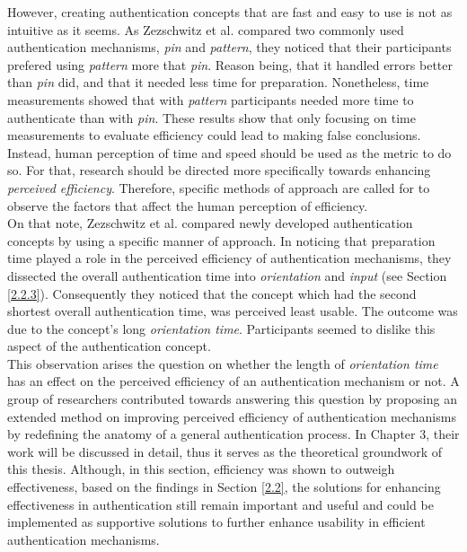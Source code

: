 However, creating authentication concepts that are fast and easy to use is not as intuitive as it seems. As Zezschwitz et al. \cite{PatternWild} compared two commonly used authentication mechanisms, \textit{pin} and \textit{pattern}, they noticed that their participants prefered using \textit{pattern} more that \textit{pin}. Reason being, that it handled errors better than \textit{pin} did, and that it needed less time for preparation. Nonetheless, time measurements showed that with \textit{pattern} participants needed more time to authenticate than with \textit{pin}. These results show that only focusing on time measurements to evaluate efficiency could lead to making false conclusions. Instead, human perception of time and speed should be used as the metric to do so. For that, research should be directed more specifically towards enhancing \textit{perceived efficiency}. Therefore, specific methods of approach are called for to observe the factors that affect the human perception of efficiency. \\

On that note, Zezschwitz et al. \cite{Marbles} compared newly developed authentication concepts by using a specific manner of approach. In noticing that preparation time played a role in the perceived efficiency of authentication mechanisms, they dissected the overall authentication time into \textit{orientation} and \textit{input} (see Section \ref{2.2.3}). Consequently they noticed that the concept which had the second shortest overall authentication time, was perceived least usable. The outcome was due to the concept's long \textit{orientation time}. Participants seemed to dislike this aspect of the authentication concept.\\
This observation arises the question on whether the length of \textit{orientation time} has an effect on the perceived efficiency of an authentication mechanism or not. A group of researchers contributed towards answering this question by proposing an extended method on improving perceived efficiency of authentication mechanisms by redefining the anatomy of a general authentication process. In Chapter 3, their work will be discussed in detail, thus it serves as the theoretical groundwork of this thesis. Although, in this section, efficiency was shown to outweigh effectiveness, based on the findings in Section \ref{2.2}, the solutions for enhancing effectiveness in authentication still remain important and useful and could be implemented as supportive solutions to further enhance usability in efficient authentication mechanisms.



